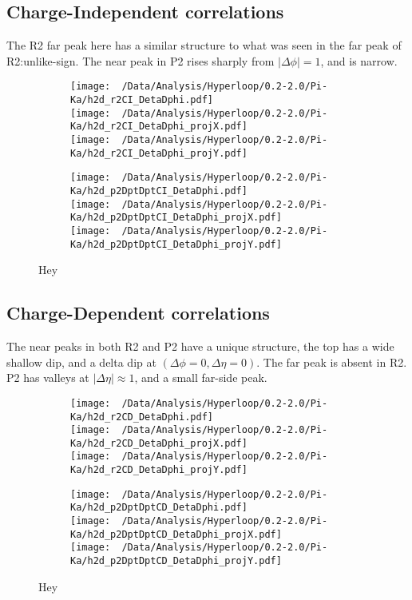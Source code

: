 \documentclass[12pt,a4paper,twoside]{report}
\begin{document}
\subsection{Charge-Independent correlations}
The R2 far peak here has a similar structure to what was seen in the far peak of R2:unlike-sign. The near peak in P2 rises sharply from $|\Delta\phi|=1$, and is narrow.
\begin{figure}[H]
	\begin{subfigure}{0.49\linewidth}
		\texttt{[image: ~/Data/Analysis/Hyperloop/0.2-2.0/Pi-Ka/h2d\_r2CI\_DetaDphi.pdf]}\\
		\texttt{[image: ~/Data/Analysis/Hyperloop/0.2-2.0/Pi-Ka/h2d\_r2CI\_DetaDphi\_projX.pdf]}\\
		\texttt{[image: ~/Data/Analysis/Hyperloop/0.2-2.0/Pi-Ka/h2d\_r2CI\_DetaDphi\_projY.pdf]}\\
	\end{subfigure}
	\begin{subfigure}{0.49\linewidth}
		\texttt{[image: ~/Data/Analysis/Hyperloop/0.2-2.0/Pi-Ka/h2d\_p2DptDptCI\_DetaDphi.pdf]}\\
		\texttt{[image: ~/Data/Analysis/Hyperloop/0.2-2.0/Pi-Ka/h2d\_p2DptDptCI\_DetaDphi\_projX.pdf]}\\
		\texttt{[image: ~/Data/Analysis/Hyperloop/0.2-2.0/Pi-Ka/h2d\_p2DptDptCI\_DetaDphi\_projY.pdf]}\\
	\end{subfigure}
	\caption{Hey}
\end{figure}
\subsection{Charge-Dependent correlations}
The near peaks in both R2 and P2 have a unique structure, the top has a wide shallow dip, and a delta dip at $(\Delta\phi=0,\Delta\eta=0)$. The far peak is absent in R2. P2 has valleys at $|\Delta\eta|\approx1$, and a small far-side peak.
\begin{figure}[H]
	\begin{subfigure}{0.49\linewidth}
		\texttt{[image: ~/Data/Analysis/Hyperloop/0.2-2.0/Pi-Ka/h2d\_r2CD\_DetaDphi.pdf]}\\
		\texttt{[image: ~/Data/Analysis/Hyperloop/0.2-2.0/Pi-Ka/h2d\_r2CD\_DetaDphi\_projX.pdf]}\\
		\texttt{[image: ~/Data/Analysis/Hyperloop/0.2-2.0/Pi-Ka/h2d\_r2CD\_DetaDphi\_projY.pdf]}\\
	\end{subfigure}
	\begin{subfigure}{0.49\linewidth}
		\texttt{[image: ~/Data/Analysis/Hyperloop/0.2-2.0/Pi-Ka/h2d\_p2DptDptCD\_DetaDphi.pdf]}\\
		\texttt{[image: ~/Data/Analysis/Hyperloop/0.2-2.0/Pi-Ka/h2d\_p2DptDptCD\_DetaDphi\_projX.pdf]}\\
		\texttt{[image: ~/Data/Analysis/Hyperloop/0.2-2.0/Pi-Ka/h2d\_p2DptDptCD\_DetaDphi\_projY.pdf]}\\
	\end{subfigure}
	\caption{Hey}
\end{figure}
\end{document}
